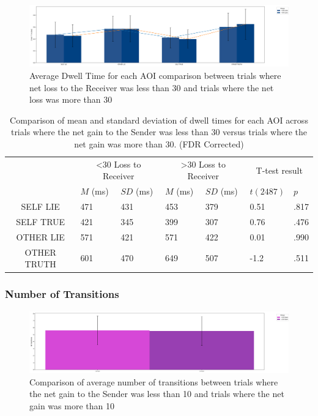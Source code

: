 \documentclass[man, floatsintext]{apa7}
\begin{document}
\begin{figure}[H]
	\centering
	\includegraphics[width=\linewidth]{../plots/RESPONSE/AvgDwellPerLossPlot30.png}
	\caption{Average Dwell Time for each AOI comparison between trials where net loss to the Receiver was less than 30 and trials where the net loss was more than 30}
	\label{fig:AvgDwellPerLoss30}
\end{figure}

\begin{table}[H]
	\centering
	\begin{tabular}{|c|p{1.5cm}|p{2cm}|p{1.5cm}|p{2cm}|p{2cm}|p{1.5cm}|}
		\hline
		\multirow{2}{*}{} & \multicolumn{2}{c|}{<30 Loss to Receiver} & \multicolumn{2}{c|}{>30 Loss to Receiver} & \multicolumn{2}{c|}{T-test result} \\ \cline{2-7}
		& $M$ (ms) &$SD$ (ms) & $M$ (ms) & $SD$ (ms) & $t(2487)$ & $p$ \\ \hline
		SELF LIE & 471 & 431 & 453 & 379 & 0.51 & .817  \\ \hline
		SELF TRUE & 421 & 345 & 399 & 307 & 0.76 & .476 \\ \hline
		OTHER LIE & 571 & 421 & 571 & 422 & 0.01 & .990 \\ \hline
		OTHER TRUTH & 601 & 470 & 649 & 507 & -1.2 & .511 \\ \hline
	\end{tabular}
	\vspace{0.3cm}
	\caption{Comparison of mean and standard deviation of dwell times for each AOI across trials where the net gain to the Sender was less than 30 versus trials where the net gain was more than 30. (FDR Corrected)}
	\label{tab:NetLossPerDwell30}
\end{table}

\subsubsection{Number of Transitions}

\begin{figure}[H]
	\centering
	\includegraphics[width=0.75\linewidth]{../plots/RESPONSE/NTransitionPerGain.png}
	\caption{Comparison of average number of transitions between trials where the net gain to the Sender was less than 10 and trials where the net gain was more than 10}
	\label{fig:NTransitionPerGain}
\end{figure}
\end{document}
